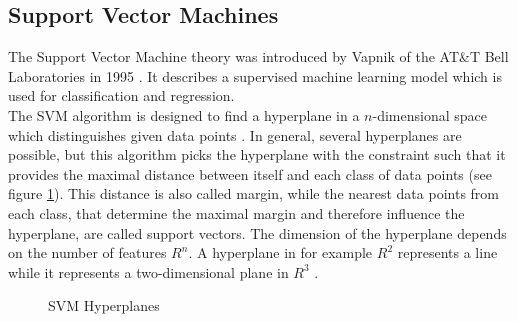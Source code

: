 \documentclass[
	english,
	ruledheaders=section,%
	class=report,%
	thesis={type=master},%
	accentcolor=8c,%
	custommargins=true,%
	marginpar=false,%
	parskip=half-,%
	fontsize=11pt,%
]{tudapub}
\begin{document}
\subsection{Support Vector Machines}
The Support Vector Machine theory was introduced by Vapnik of the AT\&T Bell Laboratories in 1995 \cite{vapnik1995t}. It describes a supervised machine learning model which is used for classification and regression.\\
The SVM algorithm is designed to find a hyperplane in a $n$-dimensional space which distinguishes given data points \cite{awad2015efficient}. In general, several hyperplanes are possible, but this algorithm picks the hyperplane with the constraint such that it provides the maximal distance between itself and each class of data points (see figure \ref{fig:svm}). This distance is also called margin, while the nearest data points from each class, that determine the maximal margin and therefore influence the hyperplane, are called support vectors. The dimension of the hyperplane depends on the number of features $R^{n}$. A hyperplane in for example $R^{2}$ represents a line while it represents a two-dimensional plane in $R^{3}$ \cite{awad2015efficient}.\\
\begin{figure}[hp]%
    \centering
    \qquad
    \caption{SVM Hyperplanes \cite{lin2017research}}%
    \label{fig:svm}%
\end{figure}
\end{document}
